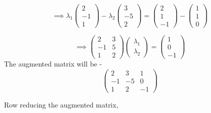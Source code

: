\documentclass[journal,12pt,twocolumn]{IEEEtran}
\begin{document}
\begin{equation}
    \implies \lambda_1 \begin{pmatrix}
2 \\ 
-1 \\ 
1 
\end{pmatrix} - \lambda_2 \begin{pmatrix}
3 \\ 
-5 \\ 
2 
\end{pmatrix} = \begin{pmatrix}
2 \\ 
1 \\ 
-1 
\end{pmatrix} -  \begin{pmatrix}
1 \\ 
1 \\ 
0 
\end{pmatrix}
\end{equation}

\begin{equation}
    \implies \begin{pmatrix}
2 & 3 \\ 
-1 & 5\\ 
1 & 2
\end{pmatrix} \begin{pmatrix}
\lambda_1 \\
\lambda_2
\end{pmatrix} = \begin{pmatrix}
1 \\
0 \\
-1
\end{pmatrix}
\end{equation}
The augmented matrix will be - 
\begin{equation}
    \begin{pmatrix}
    2 & 3 & 1\\
    -1 & -5 & 0 \\
    1 & 2 & -1
    \end{pmatrix}
\end{equation}

Row reducing the augmented matrix, 
\end{document}
